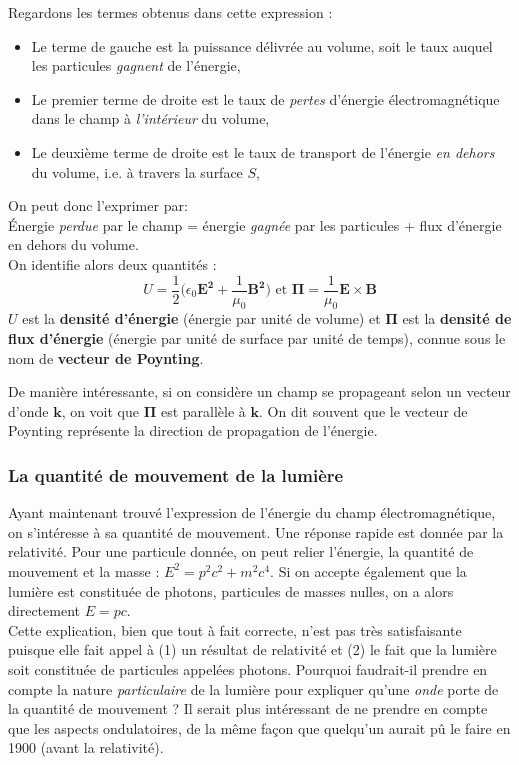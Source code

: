 Regardons les termes obtenus dans cette expression :
\begin{itemize}
\item Le terme de gauche est la puissance délivrée au volume, soit le taux auquel les particules \textit{gagnent} de l'énergie,
\item Le premier terme de droite est le taux de \textit{pertes} d'énergie électromagnétique dans le champ à \textit{l'intérieur} du volume,
\item Le deuxième terme de droite est le taux de transport de l'énergie \textit{en dehors} du volume, i.e. à travers la surface $S$,
\end{itemize}
On peut donc l'exprimer par:\\\'Energie \textit{perdue} par le champ = énergie \textit{gagnée} par les particules + flux d'énergie en dehors du volume. \\On identifie alors deux quantités :
\begin{equation}
U=\frac{1}{2}\biggl(\epsilon_0\bm{E^2}+\frac{1}{\mu_0}\bm{B^2}\biggr) \mbox{   et   } \bm{\Pi} = \frac{1}{\mu_0}\bm{E}\times\bm{B}
\label{Def.Poynting}
\end{equation}
$U$ est la \textbf{densité d'énergie} (énergie par unité de volume) et $\bm{\Pi}$ est la \textbf{densité de flux d'énergie} (énergie par unité de surface par unité de temps), connue sous le nom de \textbf{vecteur de Poynting}.

De manière intéressante, si on considère un champ se propageant selon un vecteur d'onde $\bm{k}$, on voit que $\bm{\Pi}$ est parallèle à $\bm{k}$. On dit souvent que le vecteur de Poynting représente la direction de propagation de l'énergie.

\subsubsection{La quantité de mouvement de la lumière}
Ayant maintenant trouvé l'expression de l'énergie du champ électromagnétique, on s'intéresse à sa quantité de mouvement. Une réponse rapide est donnée par la relativité. Pour une particule donnée, on peut relier l'énergie, la quantité de mouvement et la masse : $E^2=p^2c^2+m^2c^4$. Si on accepte également que la lumière est constituée de photons, particules de masses nulles, on a alors directement $E = pc$.\\
Cette explication, bien que tout à fait correcte, n'est pas très satisfaisante puisque elle fait appel à (1) un résultat de relativité et (2) le fait que la lumière soit constituée de particules appelées photons. Pourquoi faudrait-il prendre en compte la nature \textit{particulaire} de la lumière pour expliquer qu'une \textit{onde} porte de la quantité de mouvement ? Il serait plus intéressant de ne prendre en compte que les aspects ondulatoires, de la même façon que quelqu'un aurait pû le faire en 1900 (avant la relativité).

